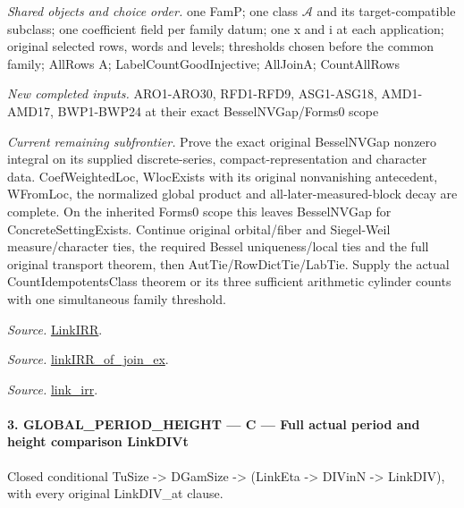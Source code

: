 \emph{Shared objects and choice order.} one FamP; one class $\mathcal A$ and its target-compatible subclass; one coefficient field per family datum; one x and i at each application; original selected rows, words and levels; thresholds chosen before the common family; AllRows A; LabelCountGoodInjective; AllJoinA; CountAllRows

\emph{New completed inputs.} ARO1-ARO30, RFD1-RFD9, ASG1-ASG18, AMD1-AMD17, BWP1-BWP24 at their exact BesselNVGap/Forms0 scope

\emph{Current remaining subfrontier.} Prove the exact original BesselNVGap nonzero integral on its supplied discrete-series, compact-representation and character data. CoefWeightedLoc, WlocExists with its original nonvanishing antecedent, WFromLoc, the normalized global product and all-later-measured-block decay are complete. On the inherited Forms0 scope this leaves BesselNVGap for ConcreteSettingExists. Continue original orbital/fiber and Siegel-Weil measure/character ties, the required Bessel uniqueness/local ties and the full original transport theorem, then AutTie/RowDictTie/LabTie. Supply the actual CountIdempotentsClass theorem or its three sufficient arithmetic cylinder counts with one simultaneous family threshold.

\emph{Source.} \href{https://github.com/CocoSgt/riemann-hypothesis-lean/blob/7cbf7a0c32fca1badf05931879a37c3f8a2b03b4/src/Formalism/SharpRestriction/GlobalTheoremInputs.lean#L55-L58}{LinkIRR}.

\emph{Source.} \href{https://github.com/CocoSgt/riemann-hypothesis-lean/blob/7cbf7a0c32fca1badf05931879a37c3f8a2b03b4/src/Development/AbelianVarietyTheory/Proofs/GlobalInterpolation/LinkIRROfJoinEx.lean#L17-L38}{linkIRR\_\allowbreak of\_\allowbreak join\_\allowbreak ex}.

\emph{Source.} \href{https://github.com/CocoSgt/riemann-hypothesis-lean/blob/7cbf7a0c32fca1badf05931879a37c3f8a2b03b4/src/Development/AbelianVarietyTheory/Proofs/GlobalInterpolation/LinkIRROfJoinEx.lean#L143-L166}{link\_\allowbreak irr}.



\paragraph{3. GLOBAL\_\allowbreak PERIOD\_\allowbreak HEIGHT — C — Full actual period and height comparison LinkDIVt}

Closed conditional TuSize -> DGamSize -> (LinkEta -> DIVinN -> LinkDIV), with every original LinkDIV\_\allowbreak at clause.

